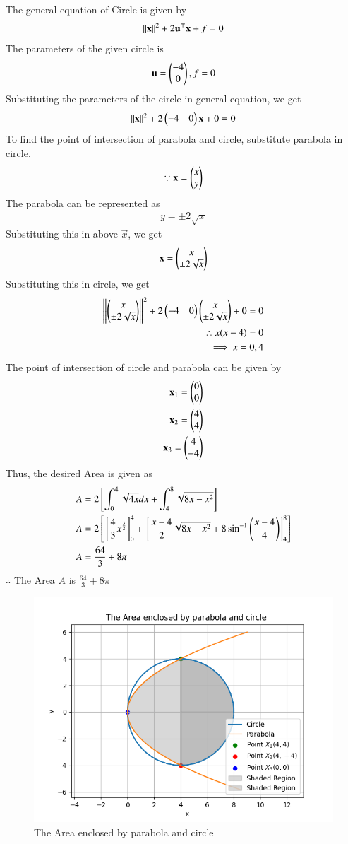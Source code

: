 \documentclass[journal]{IEEEtran}
\begin{document}
The general equation of Circle is given by 
\begin{align}
    \left\lVert\mathbf{x}\right\rVert^2 + 2\mathbf{u}^\top \mathbf{x} + f = 0
\end{align}
The parameters of the given circle is 
\begin{align}
    \mathbf{u} = \begin{pmatrix}-4 \\ 0 \end{pmatrix}, f = 0
\end{align}
Substituting the parameters of the circle in general equation, we get
\begin{align}
    \left\lVert\mathbf{x}\right\rVert^2 + 2\begin{pmatrix}-4 & 0\end{pmatrix}\mathbf{x} + 0 = 0
\end{align}
To find the point of intersection of parabola and circle, substitute parabola in circle.
\begin{align}
    \because \mathbf{x} = \begin{pmatrix}x \\ y\end{pmatrix}
\end{align}
The parabola can be represented as
\begin{align}
    y = \pm 2\sqrt{x}
\end{align}
Substituting this in above $\vec{x}$, we get 
\begin{align}
    \mathbf{x} = \begin{pmatrix}x \\  \pm 2\sqrt{x}\end{pmatrix}
\end{align}
Substituting this in circle, we get
\begin{align}
    \left\lVert\begin{pmatrix}x \\ \pm 2 \sqrt{x}\end{pmatrix}\right\rVert^2 + 2 \begin{pmatrix}-4 & 0\end{pmatrix}\begin{pmatrix}x \\ \pm 2\sqrt{x}\end{pmatrix} + 0 = 0\\
    \therefore x(x-4) = 0\\
    \implies x = 0,4
\end{align}
The point of intersection of circle and parabola can be given by
\begin{align}
    \mathbf{x}_1 = \begin{pmatrix}0 \\ 0\end{pmatrix}\\
    \mathbf{x}_2 = \begin{pmatrix}4 \\ 4\end{pmatrix}\\
    \mathbf{x}_3 = \begin{pmatrix}4 \\ -4\end{pmatrix}
\end{align}
Thus, the desired Area is given as
    \begin{align}
    A &= 2{}\left[\int_{0}^{4}\sqrt{4x}dx + \int_{4}^{8}\sqrt{8x - x^2} \right] \\
    A &= 2{}\left[{}\left[\frac{4}{3} x^{\frac{3}{2}}\right]_{0}^{4} + {}\left[\frac{x-4}{2}\sqrt{8x - x^2} + 8 \sin^{-1}\left(\frac{x-4}{4}\right)\right]_4^8 \right]\\
     A &= \frac{64}{3}+ 8 \pi
\end{align}
$\therefore$ The Area $A$ is $\frac{64}{3} + 8\pi$
\begin{figure}[h!]
   \centering
   \includegraphics[width = .7\linewidth]{figs/fig.png}
   \caption{The Area enclosed by parabola and circle}
   \label{stemplot}
   \end{figure}
\end{document}
